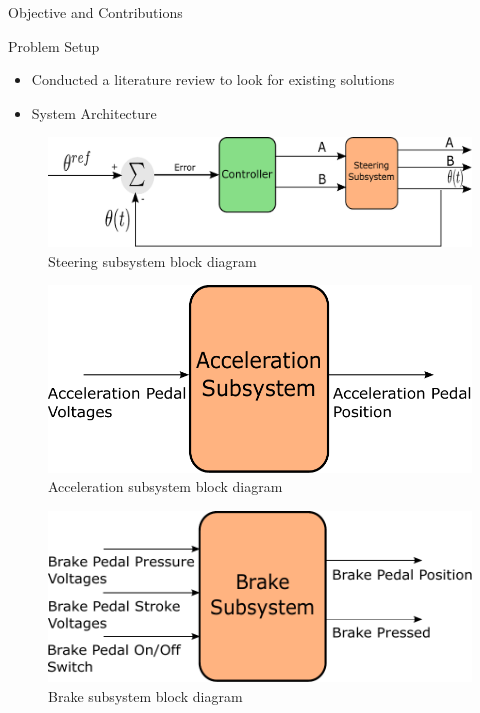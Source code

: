 \documentclass[final]{beamer}
\newlength{\onecolwid}
\begin{document}
\begin{frame}[t]
\begin{columns}[t]
\begin{column}{\onecolwid}
\begin{alertblock}{Objective and Contributions}
%


\end{alertblock}

\begin{alertblock}{Problem Setup}



\begin{itemize}
	\item Conducted a literature review to look for existing solutions
	\item System Architecture 
\end{itemize}
 

\begin{figure}
	\centering
	\includegraphics[width=1.0\linewidth]{figs/inkscape/steeringModelBlockDiagram}
	\caption{Steering subsystem block diagram}
\end{figure}

\begin{figure}
	\centering
	\includegraphics[width=0.48\linewidth]{figs/inkscape/accelerationModelArchitecture}
	\caption{Acceleration subsystem block diagram}
\end{figure}

\begin{figure}
	\centering
	\includegraphics[width=0.48\linewidth]{figs/inkscape/brakeModelArchitecture}
	\caption{Brake subsystem block diagram}
\end{figure}



\end{alertblock}
\end{column}
\end{columns}
\end{frame}
\end{document}
